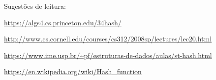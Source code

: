 \begin{frame}
\framebreak
Sugestões de leitura:
\vspace{2ex}

\vspace{2ex}

\url{https://algs4.cs.princeton.edu/34hash/}
\vspace{2ex}

\url{http://www.cs.cornell.edu/courses/cs312/2008sp/lectures/lec20.html}
\vspace{2ex}

\url{https://www.ime.usp.br/~pf/estruturas-de-dados/aulas/st-hash.html}
\vspace{2ex}

\url{https://en.wikipedia.org/wiki/Hash_function}




\end{frame}
